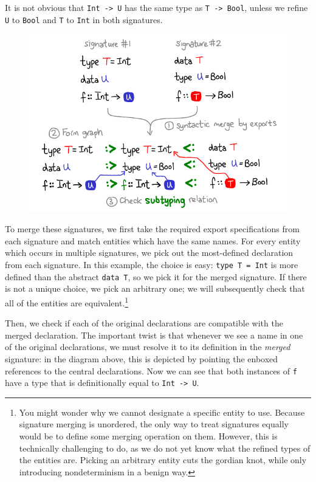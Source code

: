 \noindent
It is not obvious that \verb|Int -> U| has the same type as \verb|T -> Bool|,
unless we refine \verb|U| to \verb|Bool| and \verb|T| to \verb|Int| in
both signatures.

\begin{figure}[H]
\center\includegraphics{figures/signature-merging.pdf}
\end{figure}

\noindent
To merge these signatures,
we first take the required export specifications from each signature and
match entities which have the same names.
For every entity which occurs in multiple signatures,
we pick out the most-defined
declaration from each signature.  In this example, the choice is easy:
\verb|type T = Int| is more defined than the abstract \verb|data T|,
so we pick it for the merged signature.
If there is not a unique choice, we pick an arbitrary one; we will
subsequently check that all of the entities are equivalent.\footnote{You might
wonder why we cannot designate a specific entity to use.  Because
signature merging is unordered, the only way to treat signatures equally
would be to define some merging operation on them.  However, this is
technically challenging to do, as we do not yet know what the refined
types of the entities are.  Picking an arbitrary entity cuts the
gordian knot, while only introducing nondeterminism in a benign way.}

Then, we check if each of the original declarations are compatible with
the merged declaration.  The important twist is that whenever we
see a name in one of the original declarations, we must resolve it
to its definition in the \emph{merged} signature: in the diagram above,
this is depicted by pointing the enboxed references to the central
declarations.  Now we can see that both instances of \verb|f| have a type that
is definitionally equal to \verb|Int -> U|.

